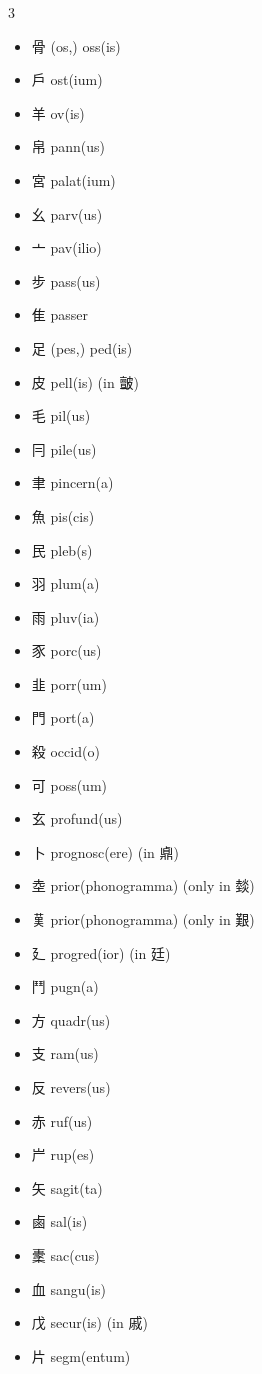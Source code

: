\documentclass[xetex, svgnames, 12pt]{scrartcl}
\begin{document}
\begin{multicols}{3}
\begin{itemize}[noitemsep]
    \item 骨 (os,) oss(is) 
    \item 戶 ost(ium)
    \item 羊 ov(is)
    \item 帛 pann(us)
    \item 宮 palat(ium)
    \item 幺 parv(us) 
    \item 亠 pav(ilio)
    \item 步 pass(us)
    \item 隹 passer
    \item 足 (pes,) ped(is) 
    \item 皮 pell(is) (in 皽)
    \item 毛 pil(us)
    \item 冃 pile(us)
    \item 聿 pincern(a) 
    \item 魚 pis(cis) 
    \item 民 pleb(s)
    \item 羽 plum(a)
    \item 雨 pluv(ia) 
    \item 豕 porc(us) 
    \item 韭 porr(um)
    \item 門 port(a) 
    \item 殺 occid(o)
    \item 可 poss(um) 
    \item 玄 profund(us) 
    \item 卜 prognosc(ere) (in 鼑)
    \item 坴 prior(phonogramma) (only in 燅)
    \item 𦰩 prior(phonogramma) (only in 艱)
    \item 廴 progred(ior) (in 廷)
    \item 鬥 pugn(a)
    \item 方 quadr(us)
    \item 支 ram(us) 
    \item 反 revers(us)
    \item 赤 ruf(us) 
    \item 屵 rup(es)
    \item 矢 sagit(ta)
   \item 鹵 sal(is)
   \item 㯻 sac(cus)
   \item 血 sangu(is)
    \item 戊 secur(is) (in 戚)
    \item 片 segm(entum)

\end{itemize}
\end{multicols}
\end{document}
